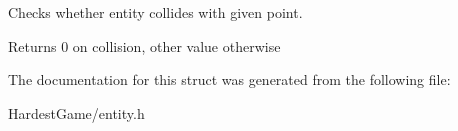 Checks whether entity collides with given point. 

\begin{DoxyReturn}{Returns}
0 on collision, other value otherwise 
\end{DoxyReturn}


The documentation for this struct was generated from the following file\+:\begin{DoxyCompactItemize}
\item 
Hardest\+Game/entity.\+h\end{DoxyCompactItemize}
